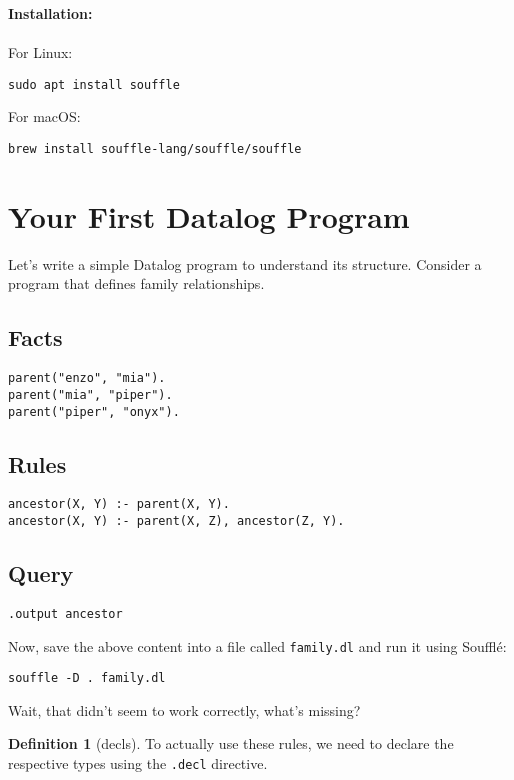 \documentclass{article}
\theoremstyle{definition}
\newtheorem{definition}[theorem]{Definition}
\begin{document}
\textbf{Installation:}
\\
\\
For Linux:
\begin{verbatim}
sudo apt install souffle
\end{verbatim}

For macOS:
\begin{verbatim}
brew install souffle-lang/souffle/souffle
\end{verbatim}

\section{Your First Datalog Program}
Let's write a simple Datalog program to understand its structure. Consider a program that defines family relationships.

\subsection{Facts}
\begin{verbatim}
parent("enzo", "mia").
parent("mia", "piper").
parent("piper", "onyx").
\end{verbatim}

\subsection{Rules}
\begin{verbatim}
ancestor(X, Y) :- parent(X, Y).
ancestor(X, Y) :- parent(X, Z), ancestor(Z, Y).
\end{verbatim}

\subsection{Query}
\begin{verbatim}
.output ancestor
\end{verbatim}

Now, save the above content into a file called \texttt{family.dl} and run it using Soufflé:
\begin{verbatim}
souffle -D . family.dl
\end{verbatim}

Wait, that didn't seem to work correctly, what's missing?
\begin{definition}[decls]
To actually use these rules, we need to declare the respective types using the \texttt{.decl} directive.
\end{definition}
\end{document}
